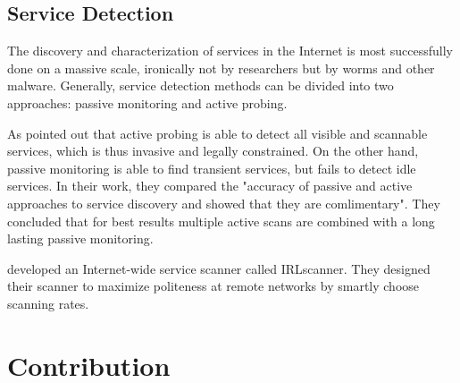 
\subsection{Service Detection} 
The discovery and characterization of services in the Internet is most successfully done on a massive scale, ironically not by researchers but by worms and other malware\citep{Chen:2007}. Generally, service detection methods can be divided into two approaches: passive monitoring and active probing. 

As \citet{Bartlett07b} pointed out that active probing is able to detect all visible and scannable services, which is thus invasive and legally constrained. On the other hand, passive monitoring is able to find transient services, but fails to detect idle services. In their work, they compared the "accuracy of passive and active approaches to service discovery and showed that they are comlimentary"\citep{Bartlett07b}. They concluded that for best results multiple active scans are combined with a long lasting passive monitoring. 

\citet{Leonard:2010} developed an Internet-wide service scanner called IRLscanner. They designed their scanner  to maximize politeness at remote networks by smartly choose scanning rates. 


\section{Contribution\label{sec:contribution}}


